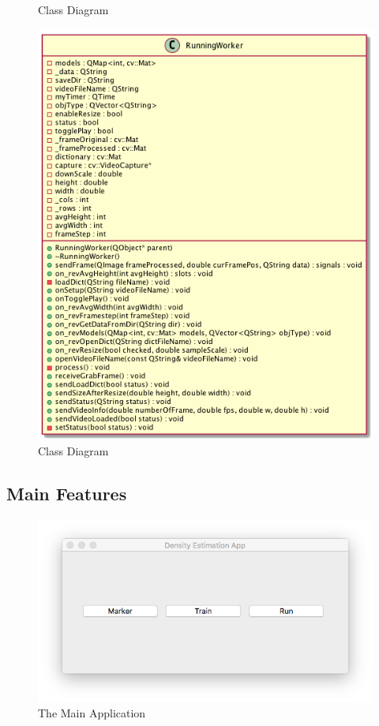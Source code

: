 \begin{center}
\begin{figure}[H]
    \caption{Class Diagram}
    \label{fig:cd-run}
  \end{figure}
  \begin{figure}[H]
    \centering
    \includegraphics[height=0.65\textheight]{Chapters/Fig/wrund}
    \caption{Class Diagram}
    \label{fig:cd-rworker}
  \end{figure}
\end{center}

\subsection{Main Features}

\begin{center}
  \begin{figure}[H]
      \includegraphics[width=\textwidth]{Chapters/Fig/Appllication}
      \caption{The Main Application}
      \label{fig:mainapp}
    \end{figure}
  \end{center}
  \begin{center}
\end{center}

